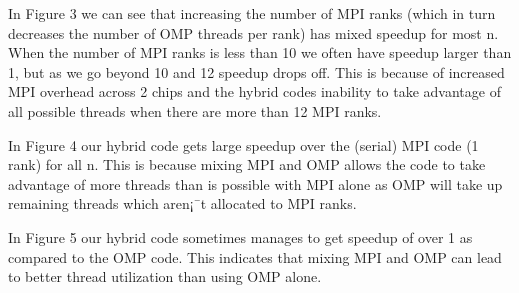 In Figure 3 we can see that increasing the number of MPI ranks (which in turn
decreases the number of OMP threads per rank) has mixed speedup for most n.
When the number of MPI ranks is less than 10 we often have speedup larger than
1, but as we go beyond 10 and 12 speedup drops off. This is because of
increased MPI overhead across 2 chips and the hybrid codes inability to take
advantage of all possible threads when there are more than 12 MPI ranks.

In Figure 4 our hybrid code gets large speedup over the (serial) MPI code (1
rank) for all n. This is because mixing MPI and OMP allows the code to take
advantage of more threads than is possible with MPI alone as OMP will take up
remaining threads which aren¡¯t allocated to MPI ranks.

In Figure 5 our hybrid code sometimes manages to get speedup of over 1 as
compared to  the OMP code. This indicates that mixing MPI and OMP can lead to
better thread utilization than using OMP alone.
